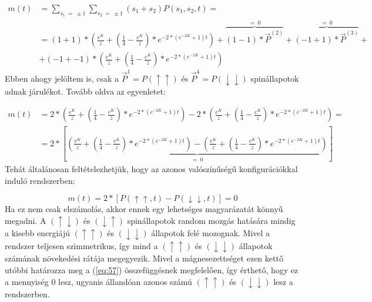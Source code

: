 \begin{align} \label{eq:55}
    m \left( t \right)
    &=
    \sum_{s_{1}\ =\ \pm 1} \sum_{s_{2}\ =\ \pm 1} \left( s_{1} + s_{2} \right)P(s_{1}, s_{2}, t)
    = \nonumber \\
    &=
    \left( 1 + 1 \right) * \left( \frac{e^{K}}{z} + \left( \frac{1}{4} - \frac{e^{K}}{z} \right) * e^{-2 * \left(e^{-2K} + 1 \right) t} \right)
    +
    \overbrace{\left( 1 - 1 \right) * \vec{P}^{\left( 2 \right)}}^{=\ 0}
    +
    \overbrace{\left( -1 + 1 \right) * \vec{P}^{\left( 3 \right)}}^{=\ 0}
    + \nonumber \\
    &+
    \left( -1 + -1 \right) * \left( \frac{e^{K}}{z} + \left( \frac{1}{4} - \frac{e^{K}}{z} \right) * e^{-2 * \left(e^{-2K} + 1 \right) t} \right)
\end{align}
Ebben ahogy jelöltem is, csak a $\vec{P}^{1} = P \left( \uparrow \uparrow \right)$ és $\vec{P}^{4} = P \left( \downarrow \downarrow \right)$ spinállapotok adnak járulékot. Tovább oldva az egyenletet:

\begin{align} \label{eq:56}
    m \left( t \right)
    &=
    2 * \left( \frac{e^{K}}{z} + \left( \frac{1}{4} - \frac{e^{K}}{z} \right) * e^{-2 * \left(e^{-2K} + 1 \right) t} \right)
    -
    2 * \left( \frac{e^{K}}{z} + \left( \frac{1}{4} - \frac{e^{K}}{z} \right) * e^{-2 * \left(e^{-2K} + 1 \right) t} \right)
    = \nonumber \\
    &=
    2 * \left[
    \underbrace{\left( \frac{e^{K}}{z} + \left( \frac{1}{4} - \frac{e^{K}}{z} \right) * e^{-2 * \left(e^{-2K} + 1 \right) t} \right)
    -
    \left( \frac{e^{K}}{z} + \left( \frac{1}{4} - \frac{e^{K}}{z} \right) * e^{-2 * \left(e^{-2K} + 1 \right) t} \right)}_{=\ 0}
    \right]
\end{align}
Tehát általánosan feltételezhetjük, hogy az azonos valószínűségű konfigurációkkal induló rendszerben:

\begin{equation} \label{eq:57}
    \boxed{
    m \left( t \right)
    =
    2 * \left[ P \left( \uparrow \uparrow, t \right) - P \left( \downarrow \downarrow, t \right) \right]
    =
    0
    }
\end{equation}
Ha ez nem csak elszámolás, akkor ennek egy lehetséges magyarázatát könnyű megadni. A $\left( \uparrow \downarrow \right)$ és $\left( \downarrow \uparrow \right)$ spinállapotok random mozgás hatására mindig a kisebb energiájú $\left( \uparrow \uparrow \right)$ és $\left( \downarrow \downarrow \right)$ állapotok felé mozognak. Mivel a rendszer teljesen szimmetrikus, így mind a $\left( \uparrow \uparrow \right)$ és $\left( \downarrow \downarrow \right)$ állapotok számának növekedési rátája megegyezik. Mivel a mágnesezettséget ezen kettő utóbbi határozza meg a (\ref{eq:57}) összefüggésnek megfelelően, így érthető, hogy ez a mennyiség $0$ lesz, ugyanis állandóan azonos számú $\left( \uparrow \uparrow \right)$ és $\left( \downarrow \downarrow \right)$ lesz a rendszerben.